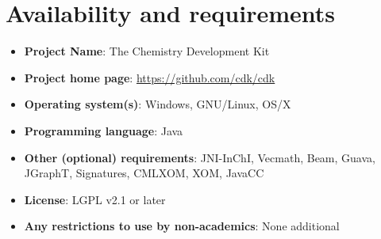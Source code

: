 \documentclass[10pt]{bmcart}
\begin{document}
\section*{Availability and requirements}

\begin{itemize}
\item \textbf{Project Name}: The Chemistry Development Kit
\item \textbf{Project home page}: \url{https://github.com/cdk/cdk}
\item \textbf{Operating system(s)}: Windows, GNU/Linux, OS/X
\item \textbf{Programming language}: Java
\item \textbf{Other (optional) requirements}: JNI-InChI, Vecmath, Beam, Guava, JGraphT, Signatures, CMLXOM, XOM, JavaCC
\item \textbf{License}: LGPL v2.1 or later
\item \textbf{Any restrictions to use by non-academics}: None additional
\end{itemize}

\end{document}
